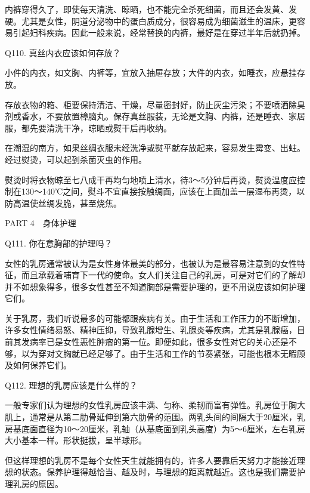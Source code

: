 \documentclass[12pt,UTF8]{ctexbook}
\begin{document}
内裤穿得久了，即使每天清洗、晾晒，也不能完全杀死细菌，而且还会发黄、发硬。尤其是女性，阴道分泌物中的蛋白质成分，很容易成为细菌滋生的温床，更容易引起妇科疾病。因此一般来说，经常替换的内裤，最好是在穿过半年后就扔掉。





Q110. 真丝内衣应该如何存放？


小件的内衣，如文胸、内裤等，宜放入抽屉存放；大件的内衣，如睡衣，应悬挂存放。

存放衣物的箱、柜要保持清洁、干燥，尽量密封好，防止灰尘污染；不要喷洒除臭剂或香水，不要放置樟脑丸。保存真丝服装，无论是文胸、内裤，还是睡衣、家居服，都先要清洗干净，晾晒或熨干后再收纳。

在潮湿的南方，如果丝绸衣服未经洗净或熨平就存放起来，容易发生霉变、出蛀。经过熨烫，可以起到杀菌灭虫的作用。

熨烫时将衣物晾至七八成干再均匀地喷上清水，待3～5分钟后再烫，熨烫温度应控制在130～140℃之间，熨斗不宜直接按触绸面，应该在上面加盖一层湿布再烫，以防高温使丝绸发脆，甚至烧焦。





PART 4　身体护理





Q111. 你在意胸部的护理吗？


女性的乳房通常被认为是女性身体最美的部分，也被认为是最容易注意到的女性特征，而且承载着哺育下一代的使命。女人们关注自己的乳房，可是对它们的了解却并不如想象得多，很多女性甚至不知道胸部是需要护理的，更不用说应该如何护理它们。

关于乳房，我们听说最多的可能都跟疾病有关。由于生活和工作压力的不断增加，许多女性情绪易怒、精神压抑，导致乳腺增生、乳腺炎等疾病，尤其是乳腺癌，目前其发病率已是女性恶性肿瘤的第一位。即便如此，很多女性对它的关心还是不够，以为穿对文胸就已经足够了。由于生活和工作的节奏紧张，可能也根本无暇顾及如何保养它们。





Q112. 理想的乳房应该是什么样的？


一般专家们认为理想的女性乳房应该丰满、匀称、柔韧而富有弹性。乳房位于胸大肌上，通常是从第二肋骨延伸到第六肋骨的范围。两乳头间的间隔大于20厘米，乳房基底面直径为10～20厘米，乳轴（从基底面到乳头高度）为5～6厘米，左右乳房大小基本一样。形状挺拔，呈半球形。

但这样理想的乳房不是每个女性天生就能拥有的，许多人要靠后天努力才能接近理想的状态。保养护理得越恰当、越及时，与理想的距离就越近。这也是我们需要护理乳房的原因。
\end{document}
